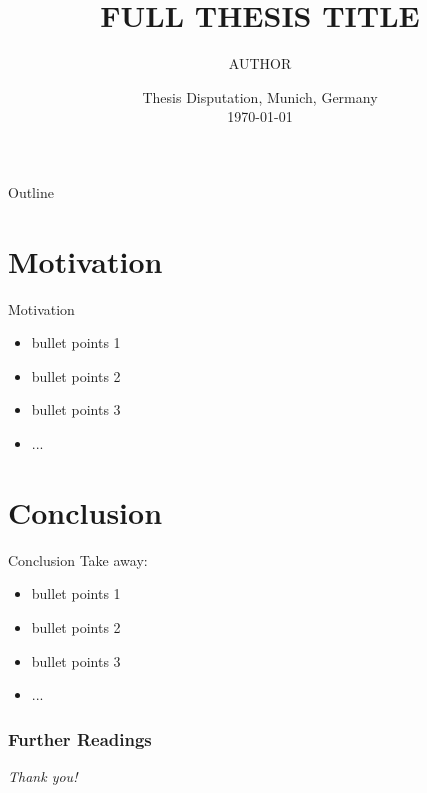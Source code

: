 \documentclass[10pt]{beamer}
\title[Short Thesis Title]{
    FULL THESIS TITLE
}
\author[AUTHOR, YEAR]{
    AUTHOR
}
\institute[LMU]{
    University of Munich \\
    \texttt{\href{firstname.lastname@campus.lmu.de}{firstname.lastname@campus.lmu.de}}
    }
\date[Thesis Disputation, \today, 2019]{
    Thesis Disputation, Munich, Germany\\
    \today
}
\begin{document}
\begin{frame}
\titlepage
\end{frame}

\begin{frame}{Outline}
    \tableofcontents
\end{frame}


\section{Motivation}
\begin{frame}{Motivation}
    \begin{itemize}
        \item bullet points 1 \pause
        \item bullet points 2 \pause
        \item bullet points 3 \cite{lamport1994latex} \pause
        \item ...
    \end{itemize}
\end{frame}

\section{Conclusion}
\begin{frame}{Conclusion}
    \small
    Take away:
    \pause
    \begin{itemize}
        \item bullet points 1
        \item bullet points 2
        \item bullet points 3 \cite{lamport2007writings}
        \item ...
    \end{itemize}
\end{frame}

\begin{frame}[allowframebreaks]
\frametitle{{Further Readings}}


\end{frame}

\begin{frame}{}
    \centering \Large
    \emph{Thank you!}
  \end{frame}
\end{document}
